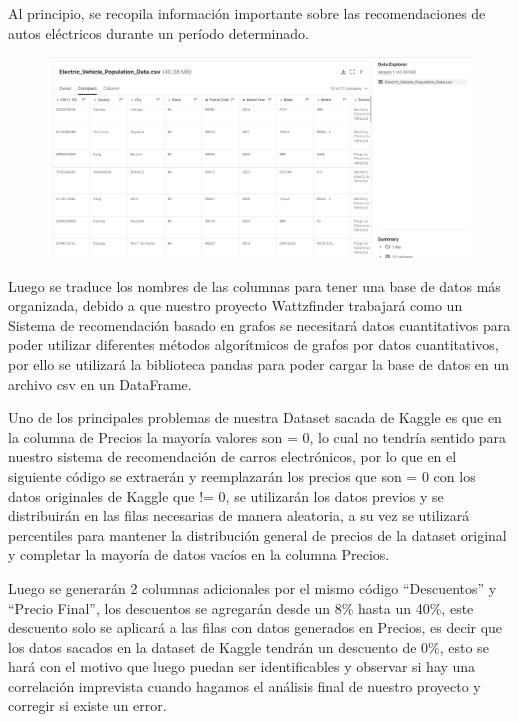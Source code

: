 \documentclass[12pt]{article}
\begin{document}
Al principio, se recopila información importante sobre las recomendaciones de autos eléctricos durante un período determinado.


\begin{figure}[htbp]
    \centering
    \includegraphics[width=\textwidth]{./imgs-latex/dataExplorer-csv-screenshot-img1.png}\label{fig:dataExplorer-csv-screenshot-img1}
\end{figure}
    

Luego se traduce los nombres de las columnas para tener una base de datos más organizada, debido a que nuestro proyecto Wattzfinder trabajará como un Sistema de recomendación basado en grafos se necesitará datos cuantitativos para poder utilizar diferentes métodos algorítmicos de grafos por datos cuantitativos, por ello se utilizará la biblioteca pandas para poder cargar la base de datos en un archivo csv en un DataFrame. 

Uno de los principales problemas de nuestra Dataset sacada de Kaggle es que en la columna de Precios la mayoría valores son = 0, lo cual no tendría sentido para nuestro sistema de recomendación de carros electrónicos, por lo que en el siguiente código se extraerán y reemplazarán los precios que son = 0 con los datos originales de Kaggle que != 0, se utilizarán los datos previos y se distribuirán en las filas necesarias de manera aleatoria, a su vez se utilizará percentiles para mantener la distribución general de precios de la dataset original y completar la mayoría de datos vacíos en la columna Precios.


Luego se generarán 2 columnas adicionales por el mismo código “Descuentos” y “Precio Final”, los descuentos se agregarán desde un 8\% hasta un 40\%, este descuento solo se aplicará a las filas con datos generados en Precios, es decir que los datos sacados en la dataset de Kaggle tendrán un descuento de 0\%, esto se hará con el motivo que luego puedan ser identificables y observar si hay una correlación imprevista cuando hagamos el análisis final de nuestro proyecto y corregir si existe un error. 
\end{document}
